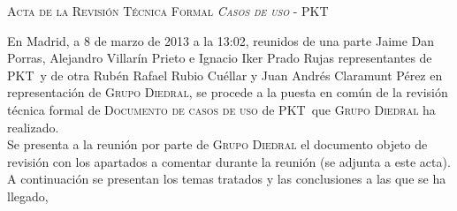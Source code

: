 \documentclass[11pt, a4paper, twoside]{report}
\newcommand*{\PKT}{P\lower2pt\hbox{K}\kern-2pt\raise2pt\hbox{T}\kern-2pt}
\begin{document}
	\begin{center}
		\scshape \large Acta de la Revisión Técnica Formal \textit{Casos de uso} - \PKT\ \vspace{.5cm}
	\end{center}

	En Madrid, a 8 de marzo de 2013 a la 13:02, reunidos de una parte Jaime Dan Porras, Alejandro Villarín Prieto e Ignacio Iker Prado Rujas representantes de \PKT\ y de otra Rubén Rafael Rubio Cuéllar y Juan Andrés Claramunt Pérez en representación de \textsc{Grupo Diedral}, se procede a la puesta en común de la revisión técnica formal de \textsc{Documento de casos de uso} de \PKT\ que \textsc{Grupo Diedral} ha realizado. \\

	Se presenta a la reunión por parte de \textsc{Grupo Diedral} el documento objeto de revisión con los apartados a comentar durante la reunión (se adjunta a este acta). \\


\noindent
A continuación se presentan los temas tratados y las conclusiones a las que se ha llegado,
\end{document}
